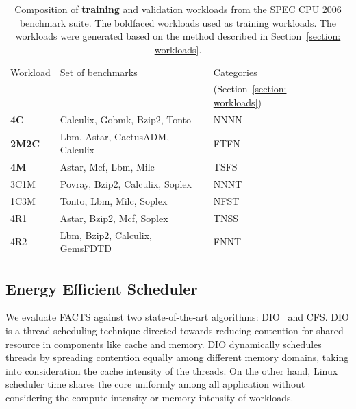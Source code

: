 \begin{table}[htbp] 
    \centering 
    \caption[REPP-C workload composition]{ Composition of \textsf{\textbf{training}} and validation workloads from
    the SPEC CPU 2006 benchmark suite. The boldfaced workloads used as training workloads. The workloads were generated based on the method described in Section~\ref{section: workloads}.} 
    \begin{tabular}{@{}lllr@{}} 
        \toprule
        Workload & Set of benchmarks & Categories \\
                 &                   & (Section~\ref{section: workloads})\\ 
        \midrule 
        \textsf{\textbf{4C}} & Calculix, Gobmk, Bzip2, Tonto     & NNNN\\ 
        \textsf{\textbf{2M2C}} & Lbm, Astar, CactusADM, Calculix & FTFN\\ 
        \textsf{\textbf{4M}} & Astar, Mcf, Lbm, Milc             & TSFS\\ 
        3C1M & Povray, Bzip2, Calculix, Soplex                   & NNNT\\ 
        1C3M & Tonto, Lbm, Milc, Soplex                          & NFST\\ 
        4R1 & Astar, Bzip2, Mcf, Soplex                          & TNSS\\
        4R2 & Lbm, Bzip2, Calculix, GemsFDTD                     & FNNT\\ 
        \bottomrule 
    \end{tabular}
    \label{tab: repworkload} 
\end{table}


\subsection{Energy Efficient Scheduler} 
\label{subsec: facts}

We evaluate FACTS against two state-of-the-art algorithms:
DIO~\citep{Blagodurov:2010:CSM:1880018.1880019} and CFS. DIO is a thread scheduling
technique directed towards reducing contention for shared resource in components like
cache and memory. DIO dynamically schedules threads by spreading contention equally among
different memory domains, taking into consideration the cache intensity of the threads.
On the other hand, Linux scheduler time shares the core uniformly among all application
without considering the compute intensity or memory intensity of workloads. 


